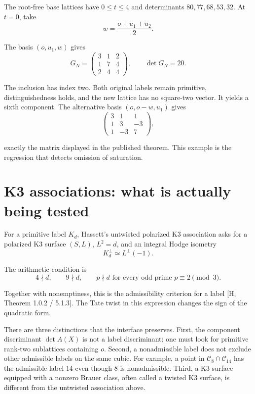 \documentclass[
  american,
  11pt,
  a4paper,
]{article}
\begin{document}
The root-free base lattices have \(0\le t\le4\) and determinants
\(80,77,68,53,32\). At \(t=0\), take
\[w=\frac{o+u_1+u_2}{2}.\]

The basis \((o,u_1,w)\) gives
\[G_N=\begin{pmatrix}3&1&2\\1&7&4\\2&4&4\end{pmatrix},\qquad\det G_N=20.\]

The inclusion has index two. Both original labels remain primitive,
distinguishedness holds, and the new lattice has no square-two vector.
It yields a sixth component. The alternative basis \((o,o-w,u_1)\) gives
\[\begin{pmatrix}3&1&1\\1&3&-3\\1&-3&7\end{pmatrix},\]

exactly the matrix displayed in the published theorem. This example is
the regression that detects omission of saturation.

\section{K3 associations: what is actually being
tested}\label{k3-associations-what-is-actually-being-tested}

For a primitive label \(K_d\), Hassett's untwisted polarized K3
association asks for a polarized K3 surface \((S,L)\), \(L^2=d\), and an
integral Hodge isometry
\[K_d^\perp\simeq L^\perp(-1).\]

The arithmetic condition is
\[4\nmid d,\qquad9\nmid d,\qquad
p\nmid d\text{ for every odd prime }p\equiv2\pmod3.\]

Together with nonemptiness, this is the admissibility criterion for a
label {[}H, Theorem 1.0.2 / 5.1.3{]}. The Tate twist in this expression
changes the sign of the quadratic form.

There are three distinctions that the interface preserves. First, the
component discriminant \(\det A(X)\) is not a label discriminant: one
must look for primitive rank-two sublattices containing \(o\). Second, a
nonadmissible label does not exclude other admissible labels on the same
cubic. For example, a point in \(\mathcal C_8\cap\mathcal C_{14}\) has
the admissible label 14 even though 8 is nonadmissible. Third, a K3
surface equipped with a nonzero Brauer class, often called a twisted K3
surface, is different from the untwisted association above.
\end{document}
